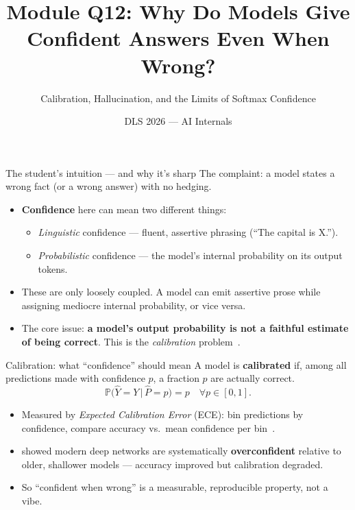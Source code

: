 \documentclass[aspectratio=169,11pt]{beamer}
\title{Module Q12: Why Do Models Give Confident Answers Even When Wrong?}
\subtitle{Calibration, Hallucination, and the Limits of Softmax Confidence}
\author{DLS 2026 --- AI Internals}
\date{}
\begin{document}
\begin{frame}
  \titlepage
\end{frame}

\begin{frame}{The student's intuition --- and why it's sharp}
  The complaint: a model states a wrong fact (or a wrong answer) with no hedging.
  \begin{itemize}
    \item \textbf{Confidence} here can mean two different things:
    \begin{itemize}
      \item \emph{Linguistic} confidence --- fluent, assertive phrasing (``The capital is X.'').
      \item \emph{Probabilistic} confidence --- the model's internal probability on its output tokens.
    \end{itemize}
    \item These are only loosely coupled. A model can emit assertive prose while assigning mediocre internal probability, or vice versa.
    \item The core issue: \textbf{a model's output probability is not a faithful estimate of being correct}. This is the \emph{calibration} problem~\citep{guo2017calibration}.
  \end{itemize}
\end{frame}

\begin{frame}{Calibration: what ``confidence'' should mean}
  A model is \textbf{calibrated} if, among all predictions made with confidence $p$, a fraction $p$ are actually correct.
  \[
    \mathbb{P}\bigl(\hat{Y}=Y \,\big|\, \hat{P}=p\bigr) = p \quad \forall p \in [0,1].
  \]
  \begin{itemize}
    \item Measured by \emph{Expected Calibration Error} (ECE): bin predictions by confidence, compare accuracy vs.\ mean confidence per bin~\citep{guo2017calibration}.
    \item \citet{guo2017calibration} showed modern deep networks are systematically \textbf{overconfident} relative to older, shallower models --- accuracy improved but calibration degraded.
    \item So ``confident when wrong'' is a measurable, reproducible property, not a vibe.
  \end{itemize}
\end{frame}
\end{document}
